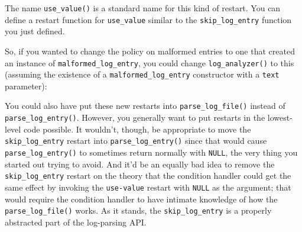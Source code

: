 The name \texttt{use\_value()} is a standard name for this kind of
restart. You can define a restart function for \texttt{use\_value}
similar to the \texttt{skip\_log\_entry} function you just defined.

\begin{Shaded}
\begin{Highlighting}[]
\StringTok{ }\NormalTok{(}
\end{Highlighting}
\end{Shaded}

So, if you wanted to change the policy on malformed entries to one that
created an instance of \texttt{malformed\_log\_entry}, you could change
\texttt{log\_analyzer()} to this (assuming the existence of a
\texttt{malformed\_log\_entry} constructor with a \texttt{text}
parameter):

\begin{Shaded}
\begin{Highlighting}[]
\StringTok{ }\NormalTok{() \{}
\StringTok{ }\NormalTok{()}
  
  \NormalTok{(}
     
      \NormalTok{(}
\NormalTok{    \},}
\NormalTok{  )}
\NormalTok{\}}
\end{Highlighting}
\end{Shaded}

You could also have put these new restarts into
\texttt{parse\_log\_file()} instead of \texttt{parse\_log\_entry()}.
However, you generally want to put restarts in the lowest-level code
possible. It wouldn't, though, be appropriate to move the
\texttt{skip\_log\_entry} restart into \texttt{parse\_log\_entry()}
since that would cause \texttt{parse\_log\_entry()} to sometimes return
normally with \texttt{NULL}, the very thing you started out trying to
avoid. And it'd be an equally bad idea to remove the
\texttt{skip\_log\_entry} restart on the theory that the condition
handler could get the same effect by invoking the \texttt{use-value}
restart with \texttt{NULL} as the argument; that would require the
condition handler to have intimate knowledge of how the
\texttt{parse\_log\_file()} works. As it stands, the
\texttt{skip\_log\_entry} is a properly abstracted part of the
log-parsing API.

